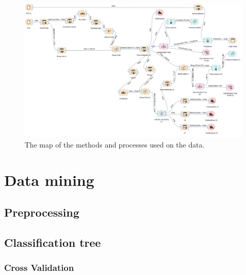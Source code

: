 \documentclass[a4paper,11pt]{article}
\begin{document}
\begin{figure}[h]
	\centering
	\includegraphics[scale=0.35]{orangeMap}
	\caption{The map of the methods and processes used on the data.}
	\label{OrangeMap}
\end{figure}


\section{Data mining}
\subsection{Preprocessing}
\subsection{Classification tree}
\subsubsection{Cross Validation}
\end{document}
